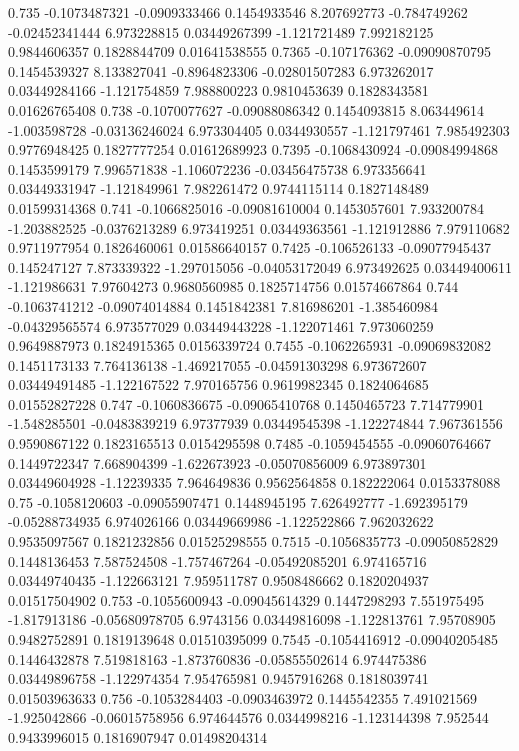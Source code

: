 {0.735 -0.1073487321 -0.0909333466 0.1454933546 8.207692773 -0.784749262 -0.02452341444 6.973228815 0.03449267399 -1.121721489 7.992182125 0.9844606357 0.1828844709 0.01641538555
0.7365 -0.107176362 -0.09090870795 0.1454539327 8.133827041 -0.8964823306 -0.02801507283 6.973262017 0.03449284166 -1.121754859 7.988800223 0.9810453639 0.1828343581 0.01626765408
0.738 -0.1070077627 -0.09088086342 0.1454093815 8.063449614 -1.003598728 -0.03136246024 6.973304405 0.0344930557 -1.121797461 7.985492303 0.9776948425 0.1827777254 0.01612689923
0.7395 -0.1068430924 -0.09084994868 0.1453599179 7.996571838 -1.106072236 -0.03456475738 6.973356641 0.03449331947 -1.121849961 7.982261472 0.9744115114 0.1827148489 0.01599314368
0.741 -0.1066825016 -0.09081610004 0.1453057601 7.933200784 -1.203882525 -0.0376213289 6.973419251 0.03449363561 -1.121912886 7.979110682 0.9711977954 0.1826460061 0.01586640157
0.7425 -0.106526133 -0.09077945437 0.145247127 7.873339322 -1.297015056 -0.04053172049 6.973492625 0.03449400611 -1.121986631 7.97604273 0.9680560985 0.1825714756 0.01574667864
0.744 -0.1063741212 -0.09074014884 0.1451842381 7.816986201 -1.385460984 -0.04329565574 6.973577029 0.03449443228 -1.122071461 7.973060259 0.9649887973 0.1824915365 0.0156339724
0.7455 -0.1062265931 -0.09069832082 0.1451173133 7.764136138 -1.469217055 -0.04591303298 6.973672607 0.03449491485 -1.122167522 7.970165756 0.9619982345 0.1824064685 0.01552827228
0.747 -0.1060836675 -0.09065410768 0.1450465723 7.714779901 -1.548285501 -0.0483839219 6.97377939 0.03449545398 -1.122274844 7.967361556 0.9590867122 0.1823165513 0.0154295598
0.7485 -0.1059454555 -0.09060764667 0.1449722347 7.668904399 -1.622673923 -0.05070856009 6.973897301 0.03449604928 -1.12239335 7.964649836 0.9562564858 0.182222064 0.0153378088
0.75 -0.1058120603 -0.09055907471 0.1448945195 7.626492777 -1.692395179 -0.05288734935 6.974026166 0.03449669986 -1.122522866 7.962032622 0.9535097567 0.1821232856 0.01525298555
0.7515 -0.1056835773 -0.09050852829 0.1448136453 7.587524508 -1.757467264 -0.05492085201 6.974165716 0.03449740435 -1.122663121 7.959511787 0.9508486662 0.1820204937 0.01517504902
0.753 -0.1055600943 -0.09045614329 0.1447298293 7.551975495 -1.817913186 -0.05680978705 6.9743156 0.03449816098 -1.122813761 7.95708905 0.9482752891 0.1819139648 0.01510395099
0.7545 -0.1054416912 -0.09040205485 0.1446432878 7.519818163 -1.873760836 -0.05855502614 6.974475386 0.03449896758 -1.122974354 7.954765981 0.9457916268 0.1818039741 0.01503963633
0.756 -0.1053284403 -0.0903463972 0.1445542355 7.491021569 -1.925042866 -0.06015758956 6.974644576 0.0344998216 -1.123144398 7.952544 0.9433996015 0.1816907947 0.01498204314
}
